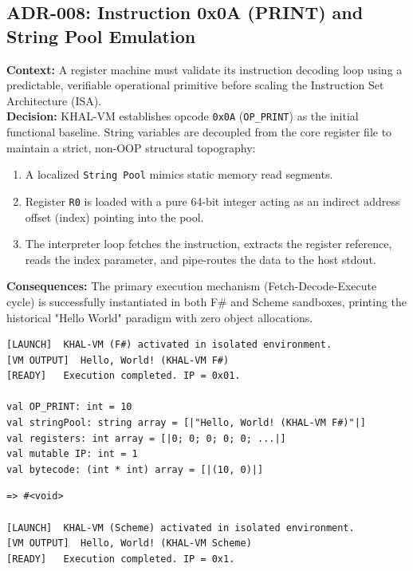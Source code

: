 \documentclass[12pt,a4paper]{article}
\begin{document}
\subsection{ADR-008: Instruction 0x0A (PRINT) and String Pool Emulation}
\textbf{Context:} A register machine must validate its instruction decoding loop using a predictable, verifiable operational primitive before scaling the Instruction Set Architecture (ISA). \\
\textbf{Decision:} KHAL-VM establishes opcode \texttt{0x0A} (\texttt{OP\_PRINT}) as the initial functional baseline. String variables are decoupled from the core register file to maintain a strict, non-OOP structural topography:
\begin{enumerate}
    \item A localized \texttt{String Pool} mimics static memory read segments.
    \item Register \texttt{R0} is loaded with a pure 64-bit integer acting as an indirect address offset (index) pointing into the pool.
    \item The interpreter loop fetches the instruction, extracts the register reference, reads the index parameter, and pipe-routes the data to the host stdout.
\end{enumerate}
\textbf{Consequences:} The primary execution mechanism (Fetch-Decode-Execute cycle) is successfully instantiated in both F\# and Scheme sandboxes, printing the historical "Hello World" paradigm with zero object allocations.


\begin{lstlisting}[basicstyle=\ttfamily\small, frame=single, title=Verified F\# Sandbox Execution Log]
[LAUNCH]  KHAL-VM (F#) activated in isolated environment.
[VM OUTPUT]  Hello, World! (KHAL-VM F#)
[READY]   Execution completed. IP = 0x01.

val OP_PRINT: int = 10
val stringPool: string array = [|"Hello, World! (KHAL-VM F#)"|]
val registers: int array = [|0; 0; 0; 0; 0; ...|]
val mutable IP: int = 1
val bytecode: (int * int) array = [|(10, 0)|]
\end{lstlisting}


\begin{lstlisting}[basicstyle=\ttfamily\small, frame=single, title=Verified Chez Scheme Sandbox Execution Log]
=> #<void>

[LAUNCH]  KHAL-VM (Scheme) activated in isolated environment.
[VM OUTPUT]  Hello, World! (KHAL-VM Scheme)
[READY]   Execution completed. IP = 0x1.
\end{lstlisting}
\end{document}
